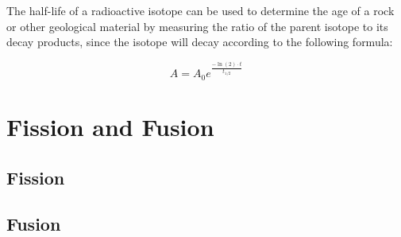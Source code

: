 The half-life of a radioactive isotope can be used to determine the age of a rock or other geological material by measuring the ratio of the parent isotope to its decay products, since the isotope will decay according to the following formula: 

	\begin{mdframed}[backgroundcolor=orange!20!white]
	\begin{equation}
		A = A_0 e^{\frac{-\ln(2)\cdot t}{t_{1/2}}}
		\label{eqn:halflife}
	\end{equation}
\end{mdframed}



\section{Fission and Fusion}
\subsection{Fission}
\subsection{Fusion}



	


